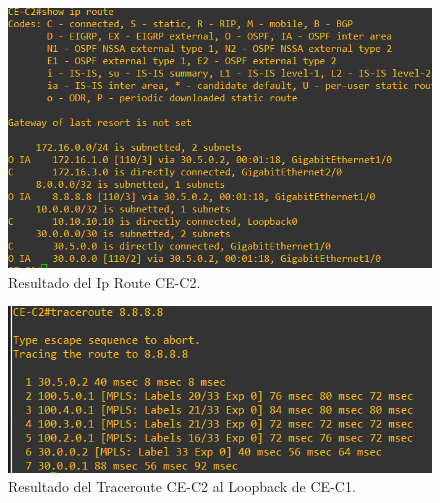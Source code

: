 \documentclass[a4paper, 12pt]{report}
\begin{document}
\begin{figure}[H]
	\centering
	\includegraphics[scale=0.6]{routeipCE.png}
	\caption{Resultado del Ip Route CE-C2.}
	\label{fig:routeipCE}
\end{figure}

\begin{figure}[H]
	\centering
	\includegraphics[scale=0.6]{traceroute8888.png}
	\caption{Resultado del Traceroute CE-C2 al Loopback de CE-C1.}
	\label{fig:traceroute8888}
\end{figure}
\appendix
\end{document}
